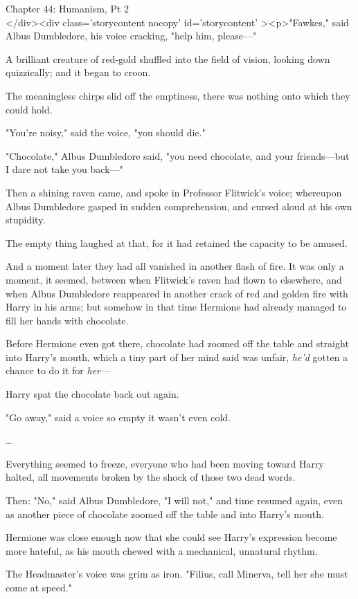 
Chapter 44: Humanism, Pt 2\\
</div><div  class='storycontent nocopy' id='storycontent' ><p>"Fawkes," said 
Albus Dumbledore, his voice cracking, "help him, please---"

A brilliant creature of red-gold shuffled into the field of vision, looking 
down quizzically; and it began to croon.

The meaningless chirps slid off the emptiness, there was nothing onto which 
they could hold.

"You're noisy," said the voice, "you should die."

"Chocolate," Albus Dumbledore said, "you need chocolate, and your friends---but 
I dare not take you back---"

Then a shining raven came, and spoke in Professor Flitwick's voice; whereupon 
Albus Dumbledore gasped in sudden comprehension, and cursed aloud at his own 
stupidity.

The empty thing laughed at that, for it had retained the capacity to be amused.

And a moment later they had all vanished in another flash of fire.
\sbreak
It was only a moment, it seemed, between when Flitwick's raven had flown to 
elsewhere, and when Albus Dumbledore reappeared in another crack of red and 
golden fire with Harry in his arms; but somehow in that time Hermione had 
already managed to fill her hands with chocolate.

Before Hermione even got there, chocolate had zoomed off the table and straight 
into Harry's mouth, which a tiny part of her mind said was unfair, \emph{he'd} 
gotten a chance to do it for \emph{her---}

Harry spat the chocolate back out again.

"Go away," said a voice so empty it wasn't even cold.

{\ldots}

Everything seemed to freeze, everyone who had been moving toward Harry halted, 
all movements broken by the shock of those two dead words.

Then: "No," said Albus Dumbledore, "I will not," and time resumed again, even 
as another piece of chocolate zoomed off the table and into Harry's mouth.

Hermione was close enough now that she could see Harry's expression become more 
hateful, as his mouth chewed with a mechanical, unnatural rhythm.

The Headmaster's voice was grim as iron. "Filius, call Minerva, tell her she 
must come at speed."

